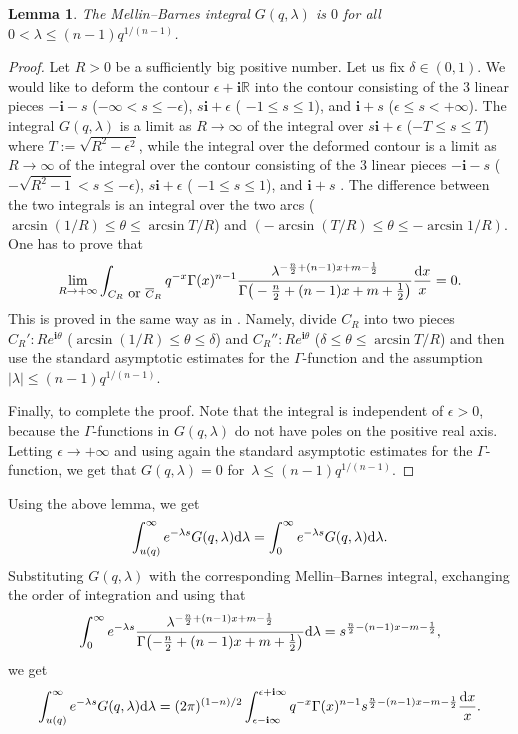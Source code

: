 \documentclass[pdftex]{sigma}
\numberwithin{equation}{section}
\newtheorem{Lemma}[Theorem]{Lemma}
\newcommand{\RR}{\mathbb{R}}
\newcommand{\ii}{\mathbf{i}}
\begin{document}
\begin{Lemma}\label{le:ac_G}
The Mellin--Barnes integral $G(q,\lambda)$ is $0$ for all $0<\lambda \leq (n-1) q^{1/(n-1)}$.
\end{Lemma}
\begin{proof}
Let $R>0$ be a sufficiently big positive number. Let us fix $\delta\in (0,1)$. We would like to deform the contour $\epsilon + \ii \RR$ into the contour consisting of the 3 linear pieces
$-\ii - s$ ($-\infty < s \leq -\epsilon$),
$s \ii + \epsilon$ ( $-1\leq s\leq 1$), and
$\ii + s$ ($\epsilon\leq s<+\infty$). The integral $G(q,\lambda)$ is a limit as $R\to \infty$ of the integral over $s\ii +\epsilon$ ($-T\leq s\leq T$) where $T:=\sqrt{R^2-\epsilon^2}$, while the integral over the deformed contour is a limit as $R\to \infty$ of the integral over the contour consisting of the 3 linear pieces
$-\ii - s$ ($-\sqrt{R^2-1} < s \leq -\epsilon$),
$s \ii + \epsilon$ ( $-1\leq s\leq 1$), and
$\ii + s$ . The difference between the two integrals is an integral over the two arcs
\smash{$C_R\colon R e^{\ii \theta}$} ($\arcsin(1/R)\leq \theta\leq \arcsin{T/R}$) and
\smash{$\overline{C}_R\colon R e^{\ii \theta}$} $(-\arcsin(T/R)\leq \theta\leq -\arcsin{1/R})$. One has to prove that
\[
\lim_{R\to +\infty} \int_{C_R \mbox{ or } \overline{C}_R}
q^{-x}\Gamma(x)^{n-1}
\frac{\lambda^{-\frac{n}{2}+(n-1)x+m-\frac{1}{2} } }{
\Gamma\big(-\frac{n}{2}+(n-1)x+m+\frac{1}{2} \big) }
\frac{{\rm d}x}{x} =0.
\]
This is proved in the same way as in \cite[Section 5]{DF}. Namely, divide $C_R$ into two pieces
$C_{R}'\colon R e^{\ii \theta}$ ($\arcsin(1/R)\leq \theta\leq \delta$) and
$C_{R}''\colon R e^{\ii \theta}$ ($\delta \leq \theta\leq \arcsin{T/R}$) and then use the standard asymptotic estimates for the $\Gamma$-function and the assumption $|\lambda|\leq (n-1) q^{1/(n-1)}$.

Finally, to complete the proof. Note that the integral is independent of $\epsilon>0$, because the $\Gamma$-functions in $G(q,\lambda)$ do not have poles on the positive real axis. Letting $\epsilon\to +\infty$ and using again the standard asymptotic estimates for the $\Gamma$-function, we get that $G(q,\lambda)=0$ for~${\lambda\leq (n-1) q^{1/(n-1)}}$.
\end{proof}

Using the above lemma, we get
\[
\int_{u(q)}^\infty e^{-\lambda s} G(q,\lambda) {\rm d}\lambda =
\int_{0}^\infty e^{-\lambda s} G(q,\lambda){\rm d}\lambda.
\]
Substituting $G(q,\lambda)$ with the corresponding Mellin--Barnes integral, exchanging the order of integration and using that
\[
\int_{0}^\infty e^{-\lambda s}
\frac{\lambda^{-\frac{n}{2}+(n-1)x+m-\frac{1}{2} } }{
\Gamma\bigl(-\frac{n}{2}+(n-1)x+m+\frac{1}{2} \bigr) } {\rm d}\lambda =
s^{\frac{n}{2}-(n-1)x-m-\frac{1}{2}},
\]
we get
\begin{equation}\label{LT-G}
\int_{u(q)}^\infty e^{-\lambda s} G(q,\lambda) {\rm d}\lambda =
(2\pi)^{(1-n)/2}
\int_{\epsilon -\ii\infty}^{\epsilon + \ii \infty}
q^{-x}\Gamma(x)^{n-1}
s^{\frac{n}{2}-(n-1)x-m-\frac{1}{2}}
\frac{{\rm d}x}{x}.
\end{equation}
\end{document}
